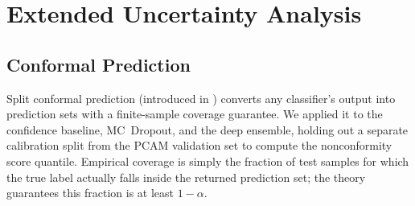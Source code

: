 \section{Extended Uncertainty Analysis}
\label{sec:extended_analysis}

\subsection{Conformal Prediction}
\label{subsec:conformal}

Split conformal prediction (introduced in ) converts any classifier's output into prediction sets with a finite-sample coverage guarantee. We applied it to the confidence baseline, MC~Dropout, and the deep ensemble, holding out a separate calibration split from the PCAM validation set to compute the nonconformity score quantile. Empirical coverage is simply the fraction of test samples for which the true label actually falls inside the returned prediction set; the theory guarantees this fraction is at least $1 - \alpha$.


\begin{table}[H]
    \centering
    \caption{Split conformal prediction results at three miscoverage levels. Coverage should meet or exceed the target $1-\alpha$. $\bar{s}$ is the average prediction set size (range 0--2 for binary classification). Singleton rate: fraction of predictions where only one class is returned (confident prediction). Full-set rate: fraction where both classes \{0,1\} are returned (model cannot commit). Any remainder ($1 - \text{singleton} - \text{full-set}$) are empty sets, which by definition cannot contain the true label and directly cause coverage failures.}

    \label{tab:conformal}
\end{table}

